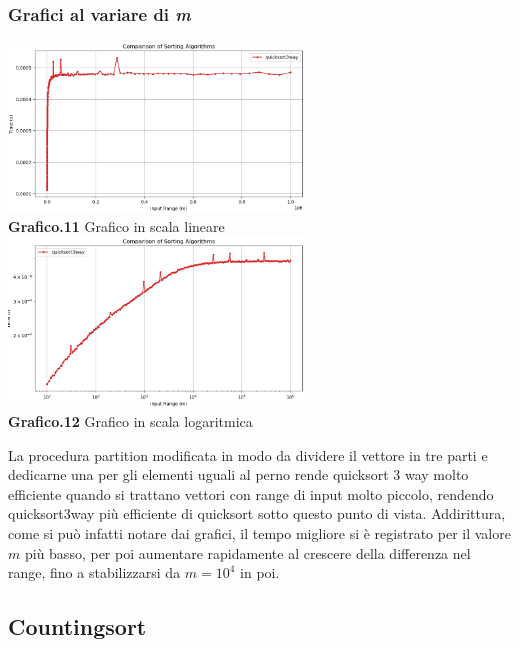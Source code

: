 \documentclass{article}
\begin{document}
        \subsubsection{Grafici al variare di \textit{m}}
            \begin{center}
                \includegraphics[width=0.6\textwidth]{QuickSort3way_InputRange.png} \\
                \textbf{Grafico.11} Grafico in scala lineare\\
                \vspace{0.5cm}
                \includegraphics[width=0.6\textwidth]{QuickSort3way_InputRange_Log.png} \\
                \textbf{Grafico.12} Grafico in scala logaritmica\\
            \end{center}
            La procedura partition modificata in modo da dividere il vettore in tre parti e dedicarne una per gli elementi uguali al perno rende quicksort 3 way molto efficiente quando si trattano vettori con range di input molto piccolo, rendendo quicksort3way più efficiente di quicksort sotto questo punto di vista. Addirittura, come si può infatti notare dai grafici, il tempo migliore si è registrato per il valore $m$ più basso, per poi aumentare rapidamente al crescere della differenza nel range, fino a stabilizzarsi da $m=10^4$ in poi.

    \subsection{Countingsort}
\end{document}
